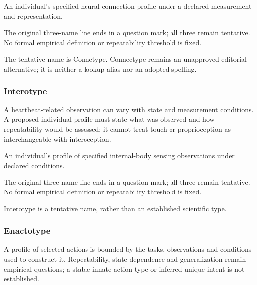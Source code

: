 \noindent An individual’s specified neural-connection profile under a declared measurement and representation.\par

\noindent The original three-name line ends in a question mark; all three remain tentative. No formal empirical definition or repeatability threshold is fixed.\par

\noindent The tentative name is Connetype. Connectype remains an unapproved editorial alternative; it is neither a lookup alias nor an adopted spelling.\par


\subsubsection*{Interotype}

\noindent A heartbeat-related observation can vary with state and measurement conditions. A proposed individual profile must state what was observed and how repeatability would be assessed; it cannot treat touch or proprioception as interchangeable with interoception.\par

\noindent An individual’s profile of specified internal-body sensing observations under declared conditions.\par

\noindent The original three-name line ends in a question mark; all three remain tentative. No formal empirical definition or repeatability threshold is fixed.\par

\noindent Interotype is a tentative name, rather than an established scientific type.\par


\subsubsection*{Enactotype}

\noindent A profile of selected actions is bounded by the tasks, observations and conditions used to construct it. Repeatability, state dependence and generalization remain empirical questions; a stable innate action type or inferred unique intent is not established.\par

